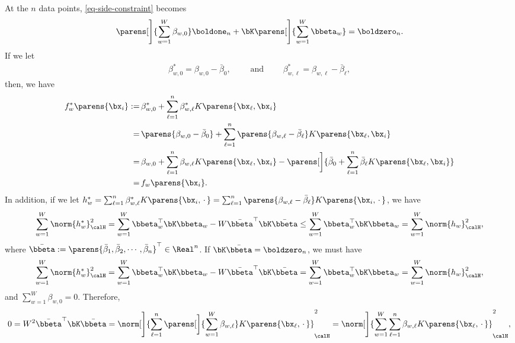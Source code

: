 \documentclass[12pt]{article}
\begin{document}
\begin{enumerate}[label=\textbf{\arabic*.}]
\begin{enumerate}
		At the $n$ data points, \eqref{eq-side-constraint} becomes 
		\begin{align*}
			\parens[\Bigg]{\sum_{w=1}^W \beta_{w,0} } \boldone_n + \bK \parens[\Bigg]{\sum_{w=1}^W \bbeta_w} = \boldzero_n. 
		\end{align*}
		If we let 
		\begin{align*}
			\beta_{w,0}^* = \beta_{w,0} - \bar{\beta}_0, \qquad \text{ and } \qquad \beta_{w,\ell}^* = \beta_{w,\ell} - \bar{\beta}_{\ell}, 
		\end{align*}
		then, we have 
		\begin{align*}
			f^*_{w} \parens{\bx_i} := & \, \beta_{w,0}^* + \sum_{\ell=1}^n \beta_{w,\ell}^* K \parens{\bx_{\ell}, \bx_{i}} \\ 
			= & \, \parens{\beta_{w,0} - \bar{\beta}_0} + \sum_{\ell=1}^n \parens{\beta_{w,\ell} - \bar{\beta}_{\ell}} K \parens{\bx_{\ell}, \bx_{i}} \\ 
			= & \, \beta_{w,0} + \sum_{\ell=1}^n \beta_{w,\ell} K \parens{\bx_{\ell}, \bx_{i}} - \parens[\bigg]{\bar{\beta}_0 + \sum_{\ell=1}^n \bar{\beta}_{\ell} K \parens{\bx_{\ell}, \bx_{i}}} \\ 
			= & \, f_{w} \parens{\bx_i}. 
		\end{align*}
		In addition, if we let $h^*_w = \sum_{\ell=1}^n \beta_{w,\ell}^* K \parens{\bx_i, \,\cdot\,} = \sum_{\ell=1}^n \parens{\beta_{w,\ell} - \bar{\beta}_{\ell}} K \parens{\bx_i, \,\cdot\,}$, we have 
		\begin{align*}
			\sum_{w=1}^W \norm{h^*_w}_{\calH}^2 = \sum_{w=1}^W \bbeta_w^\top \bK \bbeta_w - W \bar{\bbeta}^\top \bK \bar{\bbeta} \le \sum_{w=1}^W \bbeta_w^\top \bK \bbeta_w = \sum_{w=1}^W \norm{h_w}_{\calH}^2, 
		\end{align*}
		where $\bar{\bbeta} := \parens{\bar{\beta}_1, \bar{\beta}_2, \cdots, \bar{\beta}_n}^\top \in \Real^n$. If $\bK \bar{\bbeta} = \boldzero_n$, we must have 
		\begin{align*}
			\sum_{w=1}^W \norm{h^*_w}_{\calH}^2 = \sum_{w=1}^W \bbeta_w^\top \bK \bbeta_w - W \bar{\bbeta}^\top \bK \bar{\bbeta} = \sum_{w=1}^W \bbeta_w^\top \bK \bbeta_w = \sum_{w=1}^W \norm{h_w}_{\calH}^2, 
		\end{align*}
		and $\sum_{w=1}^W \beta_{w, 0} = 0$. Therefore, 
		\begin{align*}
			0 = W^2 \bar{\bbeta}^\top \bK \bar{\bbeta} = \norm[\Bigg]{\sum_{\ell=1}^n \parens[\bigg]{\sum_{w=1}^W \beta_{w, \ell}} K \parens{\bx_{\ell}, \,\cdot\,}}_{\calH}^2 = \norm[\Bigg]{\sum_{w=1}^W \sum_{\ell=1}^n \beta_{w, \ell} K \parens{\bx_{\ell}, \,\cdot\,}}_{\calH}^2, 

\end{align*}
\end{enumerate}
\end{enumerate}
\end{document}
